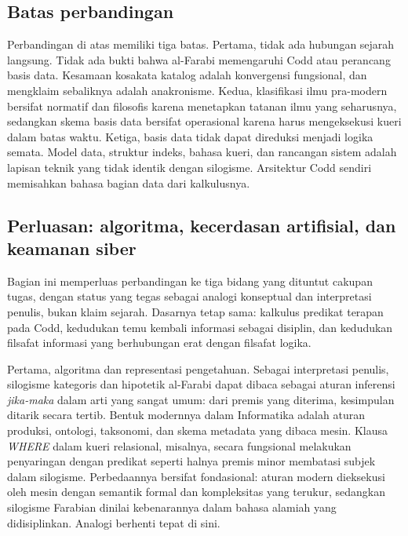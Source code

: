 \documentclass[12pt,a4paper]{article}
\begin{document}
\subsection{Batas perbandingan}

Perbandingan di atas memiliki tiga batas. Pertama, tidak ada hubungan sejarah langsung. Tidak ada bukti bahwa al-Farabi memengaruhi Codd atau perancang basis data. Kesamaan kosakata katalog adalah konvergensi fungsional, dan mengklaim sebaliknya adalah anakronisme. Kedua, klasifikasi ilmu pra-modern bersifat normatif dan filosofis karena menetapkan tatanan ilmu yang seharusnya, sedangkan skema basis data bersifat operasional karena harus mengeksekusi kueri dalam batas waktu. Ketiga, basis data tidak dapat direduksi menjadi logika semata. Model data, struktur indeks, bahasa kueri, dan rancangan sistem adalah lapisan teknik yang tidak identik dengan silogisme. Arsitektur Codd sendiri memisahkan bahasa bagian data dari kalkulusnya.\autocite[381]{codd1970}

\subsection{Perluasan: algoritma, kecerdasan artifisial, dan keamanan siber}

Bagian ini memperluas perbandingan ke tiga bidang yang dituntut cakupan tugas, dengan status yang tegas sebagai analogi konseptual dan interpretasi penulis, bukan klaim sejarah. Dasarnya tetap sama: kalkulus predikat terapan pada Codd,\autocite[381]{codd1970} kedudukan temu kembali informasi sebagai disiplin,\autocite{manning2008} dan kedudukan filsafat informasi yang berhubungan erat dengan filsafat logika.\autocite{adriaans2023}

Pertama, algoritma dan representasi pengetahuan. Sebagai interpretasi penulis, silogisme kategoris dan hipotetik al-Farabi dapat dibaca sebagai aturan inferensi \emph{jika-maka} dalam arti yang sangat umum: dari premis yang diterima, kesimpulan ditarik secara tertib. Bentuk modernnya dalam Informatika adalah aturan produksi, ontologi, taksonomi, dan skema metadata yang dibaca mesin. Klausa \emph{WHERE} dalam kueri relasional, misalnya, secara fungsional melakukan penyaringan dengan predikat seperti halnya premis minor membatasi subjek dalam silogisme. Perbedaannya bersifat fondasional: aturan modern dieksekusi oleh mesin dengan semantik formal dan kompleksitas yang terukur, sedangkan silogisme Farabian dinilai kebenarannya dalam bahasa alamiah yang didisiplinkan. Analogi berhenti tepat di sini.
\end{document}
